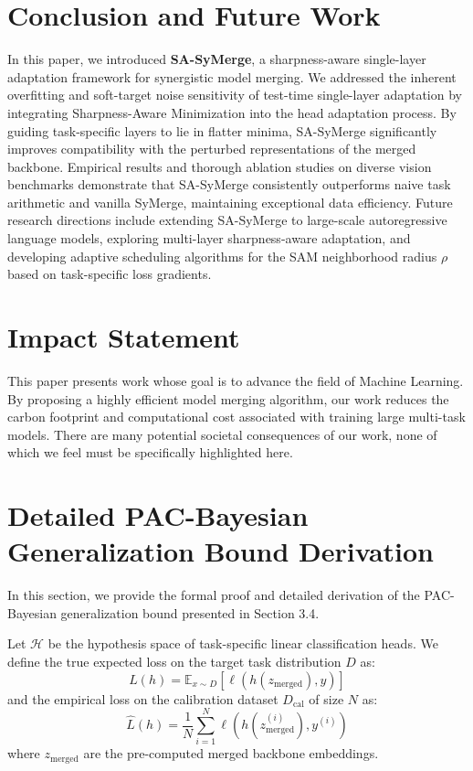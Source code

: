 \documentclass{article}
\theoremstyle{plain}
\theoremstyle{definition}
\theoremstyle{remark}
\begin{document}
\section{Conclusion and Future Work}
In this paper, we introduced \textbf{SA-SyMerge}, a sharpness-aware single-layer adaptation framework for synergistic model merging. We addressed the inherent overfitting and soft-target noise sensitivity of test-time single-layer adaptation by integrating Sharpness-Aware Minimization into the head adaptation process. By guiding task-specific layers to lie in flatter minima, SA-SyMerge significantly improves compatibility with the perturbed representations of the merged backbone. Empirical results and thorough ablation studies on diverse vision benchmarks demonstrate that SA-SyMerge consistently outperforms naive task arithmetic and vanilla SyMerge, maintaining exceptional data efficiency. 
Future research directions include extending SA-SyMerge to large-scale autoregressive language models, exploring multi-layer sharpness-aware adaptation, and developing adaptive scheduling algorithms for the SAM neighborhood radius $\rho$ based on task-specific loss gradients.

\section*{Impact Statement}
This paper presents work whose goal is to advance the field of Machine Learning. By proposing a highly efficient model merging algorithm, our work reduces the carbon footprint and computational cost associated with training large multi-task models. There are many potential societal consequences of our work, none of which we feel must be specifically highlighted here.




\newpage
\appendix
\onecolumn

\section{Detailed PAC-Bayesian Generalization Bound Derivation}
\label{app:pac_bayes}
In this section, we provide the formal proof and detailed derivation of the PAC-Bayesian generalization bound presented in Section 3.4. 

Let $\mathcal{H}$ be the hypothesis space of task-specific linear classification heads. We define the true expected loss on the target task distribution $D$ as:
\begin{equation}
    L(h) = \mathbb{E}_{x \sim D} [\ell(h(z_{\text{merged}}), y)]
\end{equation}
and the empirical loss on the calibration dataset $D_{\text{cal}}$ of size $N$ as:
\begin{equation}
    \hat{L}(h) = \frac{1}{N} \sum_{i=1}^N \ell(h(z_{\text{merged}}^{(i)}), y^{(i)})
\end{equation}
where $z_{\text{merged}}$ are the pre-computed merged backbone embeddings.
\end{document}
